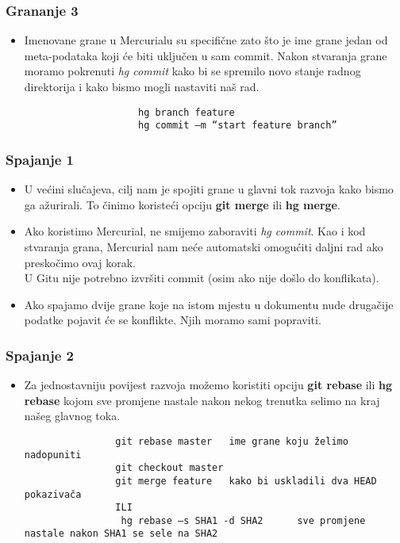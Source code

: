 \documentclass{beamer}
\begin{document}
	\begin{frame}
		\frametitle{Grananje 3}
		\begin{itemize}
			\begin{itemize}
				\item Imenovane grane u Mercurialu su specifične zato što je ime grane jedan od meta-podataka koji će biti uključen u sam commit. Nakon stvaranja grane moramo pokrenuti \textit{hg commit} kako bi se spremilo novo stanje radnog direktorija i kako bismo mogli nastaviti naš rad.
				\begin{lstlisting}
					hg branch feature
					hg commit –m “start feature branch”
				\end{lstlisting}
			\end{itemize}
		\end{itemize}
	\end{frame}

	\begin{frame}
		\frametitle{Spajanje 1}
		\begin{itemize}
			\item U većini slučajeva, cilj nam je spojiti grane u glavni tok razvoja kako bismo ga ažurirali. To činimo koristeći opciju \textbf{git merge} ili \textbf{hg merge}.
			\item Ako koristimo Mercurial, ne smijemo zaboraviti \textit{hg commit}. Kao i kod stvaranja grana, Mercurial nam neće automatski omogućiti daljni rad ako preskočimo ovaj korak. \\ U Gitu nije potrebno izvršiti commit (osim ako nije došlo do konflikata).
			\item Ako spajamo dvije grane koje na istom mjestu u dokumentu nude drugačije podatke pojavit će se konflikte. Njih moramo sami popraviti.
		\end{itemize}
	\end{frame}

	\begin{frame}
		\frametitle{Spajanje 2}
		\begin{itemize}
			\item Za jednostavniju povijest razvoja možemo koristiti opciju \textbf{git rebase} ili \textbf{hg rebase} kojom sve promjene nastale nakon nekog trenutka selimo na kraj našeg glavnog toka.
			\begin{lstlisting}
				git rebase master	ime grane koju želimo nadopuniti
 				git checkout master
				git merge feature	kako bi uskladili dva HEAD pokazivača
				ILI
				 hg rebase –s SHA1 -d SHA2	    sve promjene nastale nakon SHA1 se sele na SHA2
			\end{lstlisting}
		\end{itemize}
	\end{frame}
\end{document}
